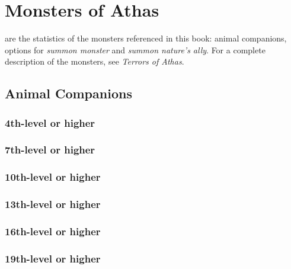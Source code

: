 \chapter{Monsters of Athas}
 are the statistics of the monsters referenced in this book: animal companions, options for \emph{summon monster} and \emph{summon nature's ally}. For a complete description of the monsters, see \emph{Terrors of Athas}.

\section{Animal Companions}
\subsection{4th-level or higher}












\subsection{7th-level or higher}














\subsection{10th-level or higher}


\subsection{13th-level or higher}


\subsection{16th-level or higher}
\subsection{19th-level or higher}
